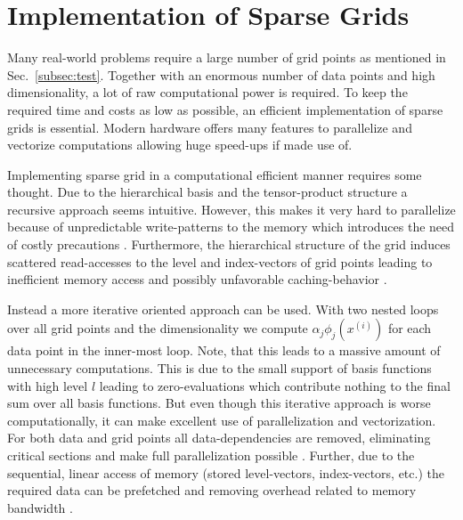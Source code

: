 \section{Implementation of Sparse Grids}
Many real-world problems require a large number of grid points as mentioned in
Sec.~\ref{subsec:test}. Together with an enormous number of data points and
high dimensionality, a lot of raw computational power is required. To keep
the required time and costs as low as possible, an efficient implementation of
sparse grids is essential. Modern hardware offers many features to parallelize
and vectorize computations allowing huge speed-ups if made use of.
\par
Implementing sparse grid in a computational efficient manner requires some
thought. Due to the hierarchical basis and the tensor-product structure
a recursive approach seems intuitive. However, this makes it
very hard to parallelize because of unpredictable write-patterns to the
memory which introduces the need of costly precautions \cite{disshei}.
Furthermore, the hierarchical structure of the grid induces scattered
read-accesses to the level and index-vectors of grid points leading to
inefficient memory access and possibly unfavorable caching-behavior \cite{disshei}.
\par
Instead a more iterative oriented approach can be used. With two nested loops
over all grid points and the dimensionality we compute $\alpha_j \phi_j(x^{(i)})$
for each data point in the inner-most loop. Note, that this leads to a massive amount of
unnecessary computations. This is due to the small support of basis functions
with high level $l$ leading to zero-evaluations which contribute nothing to
the final sum over all basis functions. But even though this iterative
approach is worse computationally, it can make excellent use of parallelization
and vectorization. For both data and grid points all data-dependencies are
removed, eliminating critical sections and make full parallelization possible
\cite{disshei}. Further, due to the sequential, linear access of memory
(stored level-vectors, index-vectors, etc.) the required data can be
 prefetched and removing overhead related to memory bandwidth \cite{disshei}.

